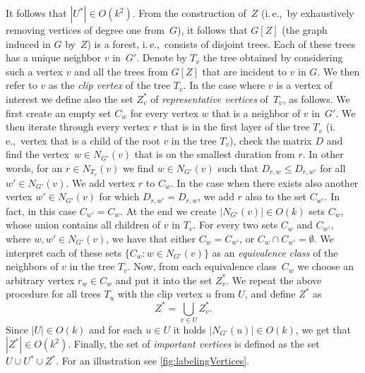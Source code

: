 \documentclass[a4paper,UKenglish,cleveref, autoref, thm-restate, anonymous]{lipics-v2021}
\newcommand{\ie}{i.\,e.,\ }
\newcommand{\deltaExact}{\textsc{Simple TGR}}
\begin{document}
It follows that $|U^*| \in O(k^2)$.
From the construction of~$Z$ (\ie by exhaustively removing vertices of degree one from~$G$), it follows that $G[Z]$ (the graph induced in $G$ by~$Z$) is a forest, \ie consists of disjoint trees. 
Each of these trees has a unique neighbor $v$ in~$G'$. 
Denote by $T_v$ the tree obtained by considering such a vertex $v$ and all the trees from $G[Z]$ that are incident to $v$ in $G$. 
We then refer to $v$ as the \emph{clip vertex} of the tree $T_v$.
In the case where $v$ is a vertex of interest we define also the set $Z^*_v$ of \emph{representative vertices} of~$T_v$, as follows.
%
We first create an empty set $C_w$ for every vertex $w$ that is a neighbor of $v$ in~$G'$.
We then iterate through every vertex $r$ that is in the first layer of the tree $T_v$ (\ie vertex that is a child of the root $v$ in the tree $T_v$), check the matrix $D$ and find the vertex~$w \in N_{G'}(v)$ that is on the smallest duration from $r$.
In other words, for an $r \in N_{T_v}(v)$ we find $w \in N_{G'}(v)$ such that $D_{r,w} \leq D_{r,w'}$ for all $w' \in  N_{G'}(v)$.
%
We add vertex $r$ to $C_w$.
In the case when there exists also another vertex $w' \in  N_{G'}(v) $ for which $D_{r,w'} = D_{r,w}$, we add $r$ also to the set $C_{w'}$. In fact, in this case $C_{w'} = C_w$.
At the end we create $|N_{G'}(v)| \in O(k)$ sets $C_w$, whose union contains all children of $v$ in $T_v$. 
For every two sets $C_w$ and $C_{w'}$, where $w,w'\in N_{G'}(v)$, we have that either $C_w = C_{w'}$, or $C_w \cap C_{w'} = \emptyset$. 
We interpret each of these sets $\{C_w : w \in N_{G'}(v)\}$ as an \emph{equivalence class} of the neighbors of $v$ in the tree $T_v$. 
Now, from each equivalence class~$C_w$ we choose an arbitrary vertex $r_w \in C_w$ and put it into the set $Z^*_v$.
%
We repeat the above procedure for all trees $T_u$ with the clip vertex $u$ from $U$, and define $Z^*$ as 
\begin{equation}
    Z^* = \bigcup\limits_{v \in U} Z^*_v.
\end{equation}
%
Since $|U| \in O(k)$ and for each $u \in U$ it holds $|N_{G'}(u)| \in O(k)$, we get that $|Z^*| \in O(k^2)$. 
Finally, the set of \emph{important vertices} is defined as the set $U \cup U^{\ast} \cup Z^{\ast}$.
For an illustration see \cref{fig:labelingVertices}.



\end{document}
